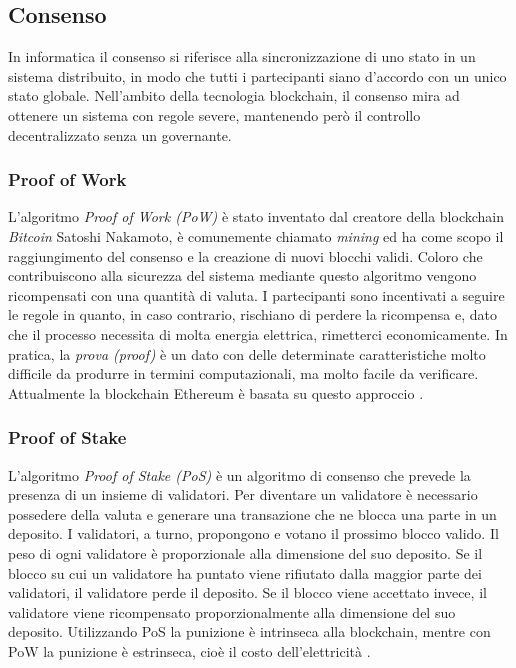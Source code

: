 \subsection{Consenso}
\label{consenso}
In informatica il consenso si riferisce alla sincronizzazione di uno stato in un sistema distribuito, in modo che tutti i partecipanti siano d'accordo con un unico stato globale. Nell'ambito della tecnologia blockchain, il consenso mira ad ottenere un sistema con regole severe, mantenendo però il controllo decentralizzato senza un governante.

\subsubsection{Proof of Work}
\label{proof-of-work}
L'algoritmo \emph{Proof of Work (PoW)} è stato inventato dal creatore della blockchain \emph{Bitcoin} Satoshi Nakamoto, è comunemente chiamato \emph{mining} ed ha come scopo il raggiungimento del consenso e la creazione di nuovi blocchi validi. Coloro che contribuiscono alla sicurezza del sistema mediante questo algoritmo vengono ricompensati con una quantità di valuta. I partecipanti sono incentivati a seguire le regole in quanto, in caso contrario, rischiano di perdere la ricompensa e, dato che il processo necessita di molta energia elettrica, rimetterci economicamente. In pratica, la \emph{prova (proof)} è un dato con delle determinate caratteristiche molto difficile da produrre in termini computazionali, ma molto facile da verificare. Attualmente la blockchain Ethereum è basata su questo approccio \cite{ethereumbook} \cite{pow}.

\subsubsection{Proof of Stake}
\label{proof-of-stake}
L'algoritmo \emph{Proof of Stake (PoS)} è un algoritmo di consenso che prevede la presenza di un insieme di validatori. Per diventare un validatore è necessario possedere della valuta e generare una transazione che ne blocca una parte in un deposito. I validatori, a turno, propongono e votano il prossimo blocco valido. Il peso di ogni validatore è proporzionale alla dimensione del suo deposito. Se il blocco su cui un validatore ha puntato viene rifiutato dalla maggior parte dei validatori, il validatore perde il deposito. Se il blocco viene accettato invece, il validatore viene ricompensato proporzionalmente alla dimensione del suo deposito. Utilizzando PoS la punizione è intrinseca alla blockchain, mentre con PoW la punizione è estrinseca, cioè il costo dell'elettricità \cite{ethereumbook}.

